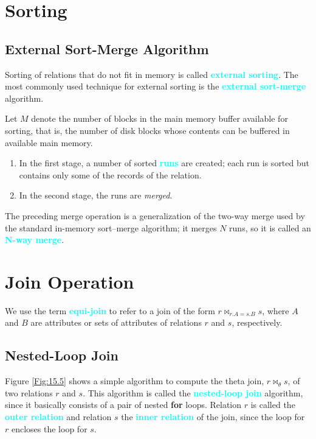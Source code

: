 \documentclass[a4paper,12pt,twoside,openany]{book}
\newcommand{\textcy}[1]{\textbf{\textcolor{cyan}{#1}}}
\begin{document}
\section{Sorting}
\subsection{External Sort-Merge Algorithm}

Sorting of relations that do not fit in memory is called \textcy{external sorting}. The most commonly used technique for external sorting is the \textcy{external sort-merge} algorithm.

Let $M$ denote the number of blocks in the main memory buffer available for sorting, that is, the number of disk blocks whose contents can be buffered in available main memory.
\begin{enumerate}
    \item In the first stage, a number of sorted \textcy{runs} are created; each run is sorted but contains only some of the records of the relation.
    \item In the second stage, the runs are \textit{merged}.
\end{enumerate}

The preceding merge operation is a generalization of the two-way merge used by the standard in-memory sort–merge algorithm; it merges $N$ runs, so it is called an \textcy{N-way merge}.

\section{Join Operation}

We use the term \textcy{equi-join} to refer to a join of the form $r\Join_{r.A=s.B}s$, where $A$ and $B$ are attributes or sets of attributes of relations $r$ and $s$, respectively.

\subsection{Nested-Loop Join}

Figure \ref{Fig:15.5} shows a simple algorithm to compute the theta join, $r\Join_\theta s$, of two relations $r$ and $s$. This algorithm is called the \textcy{nested-loop join} algorithm, since it basically consists of a pair of nested \textbf{for} loops. Relation $r$ is called the \textcy{outer relation} and relation $s$ the \textcy{inner relation} of the join, since the loop for $r$ encloses the loop for $s$.
\end{document}
